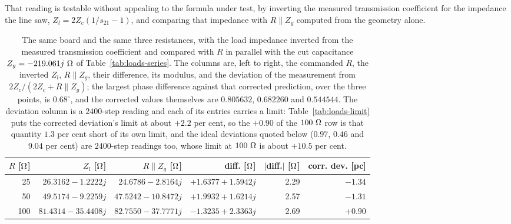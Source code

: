 That reading is testable without appealing to the formula under test, by inverting the measured transmission
coefficient for the impedance the line saw, $Z_l = 2Z_c(1/s_{21} - 1)$, and comparing that impedance with
$R \parallel Z_g$ computed from the geometry alone.

\begin{table}[H]
  \centering
  \caption{The same board and the same three resistances, with the load impedance inverted from the measured
  transmission coefficient and compared with $R$ in parallel with the cut capacitance $Z_g = -219.061j\ \Omega$ of
  Table~\ref{tab:loads-series}. The columns are, left to right, the commanded $R$, the inverted $Z_l$,
  $R \parallel Z_g$, their difference, its modulus, and the deviation of the measurement from
  $2Z_c/(2Z_c + R \parallel Z_g)$; the largest phase difference against that corrected prediction, over the
  three points, is $0.68^\circ$, and the corrected values themselves are $0.805632$, $0.682260$ and $0.544544$.
  The deviation column is a $2400$-step reading and each of its entries carries a limit: Table~\ref{tab:loads-limit}
  puts the corrected deviation's limit at about $+2.2$ per cent, so the $+0.90$ of the $100\ \Ohm$ row is that
  quantity $1.3$ per cent short of its own limit, and the ideal deviations quoted below ($0.97$, $0.46$ and $9.04$
  per cent) are $2400$-step readings too, whose limit at $100\ \Ohm$ is about $+10.5$ per cent.}
  \label{tab:loads-implied}
  \small
  \begin{tabular}{@{}rrrrrr@{}}
    \toprule
    $R$ [$\Omega$] & $Z_l$ [$\Omega$] & $R \parallel Z_g$ [$\Omega$] & diff. [$\Omega$] & $|$diff.$|$ [$\Omega$] & corr. dev. [pc] \\
    \midrule
     25 & $26.3162 - 1.2222j$ & $24.6786 - 2.8164j$ & $+1.6377 + 1.5942j$ & 2.29 & $-1.34$ \\
     50 & $49.5174 - 9.2259j$ & $47.5242 - 10.8472j$ & $+1.9932 + 1.6214j$ & 2.57 & $-1.31$ \\
    100 & $81.4314 - 35.4408j$ & $82.7550 - 37.7771j$ & $-1.3235 + 2.3363j$ & 2.69 & $+0.90$ \\
    \bottomrule
  \end{tabular}
\end{table}


